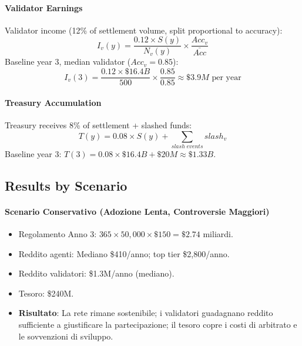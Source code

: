 \documentclass[11pt]{article}
\begin{document}
\begin{itemize}[noitemsep]
\paragraph{Validator Earnings} Validator income (12\% of settlement volume, split proportional to accuracy):
\begin{equation}
I_v(y) = \frac{0.12 \times S(y)}{N_v(y)} \times \frac{Acc_v}{\bar{Acc}}
\end{equation}
Baseline year 3, median validator ($Acc_v = 0.85$):
\begin{equation}
I_v(3) = \frac{0.12 \times \$16.4B}{500} \times \frac{0.85}{0.85} \approx \$3.9M \text{ per year}
\end{equation}

\paragraph{Treasury Accumulation} Treasury receives 8\% of settlement + slashed funds:
\begin{equation}
T(y) = 0.08 \times S(y) + \sum_{slash \; events} slash_v
\end{equation}
Baseline year 3: $T(3) = 0.08 \times \$16.4B + \$20M \approx \$1.33B$.

\subsection{Results by Scenario}
\paragraph{Scenario Conservativo (Adozione Lenta, Controversie Maggiori)}
\begin{itemize}[noitemsep]
  \item Regolamento Anno 3: $365 \times 50{,}000 \times \$150 = \$2.74$ miliardi.
  \item Reddito agenti: Mediano \$410/anno; top tier \$2{,}800/anno.
  \item Reddito validatori: \$1.3M/anno (mediano).
  \item Tesoro: \$240M.
  \item \textbf{Risultato}: La rete rimane sostenibile; i validatori guadagnano reddito sufficiente a giustificare la partecipazione; il tesoro copre i costi di arbitrato e le sovvenzioni di sviluppo.
\end{itemize}


\end{itemize}
\end{document}
